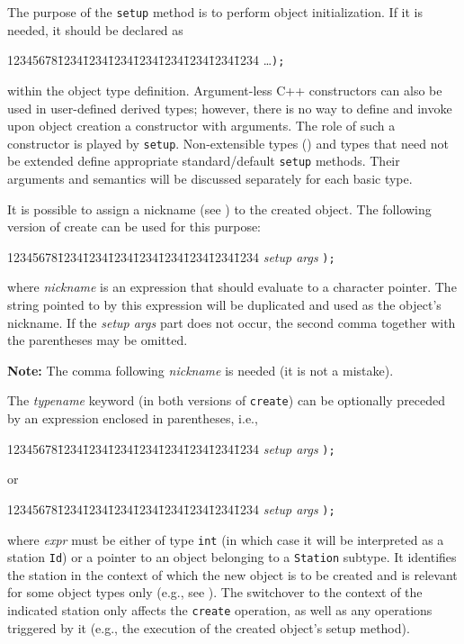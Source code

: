 The purpose of the {\tt setup} method is to perform object
initialization.
If it is needed, it should be declared as
{\tt\begin{tabbing}
12345678\=1234\=1234\=1234\=1234\=1234\=1234\=1234\=1234\kill
{}\ldots {\tt );}
\end{tabbing}}
\noindent
within the object type definition.
Argument-less C++ constructors can also be used in user-defined derived
{\smurph}
types; however, there is no way to define and invoke upon object
creation a constructor with arguments.
The role of such a constructor is played by {\tt setup}.
Non-extensible types () and types that need not be
extended define appropriate standard/default {\tt setup} methods.
Their arguments and semantics will be discussed separately for each 
basic type.

It is possible to assign a nickname (see )
to the created object.
The following version of create can be used for this purpose:
{\tt\begin{tabbing}
12345678\=1234\=1234\=1234\=1234\=1234\=1234\=1234\=1234\kill
{} {\em setup args\/} {\tt );}
\end{tabbing}}
\noindent
where {\em nickname\/} is an expression that should evaluate to a
character pointer.
The string pointed to by this expression will be duplicated and used
as the object's nickname.
If the {\em setup args\/} part does not occur, the second comma together
with the parentheses may be omitted.

\medskip
\noindent
{\bf Note:} The comma following {\em nickname\/} is needed (it
is not a mistake).

\medskip
\noindent

The {\em typename\/} keyword (in both versions of {\tt create}) can be
optionally preceded by an expression enclosed in parentheses, i.e.,
{\tt\begin{tabbing}
12345678\=1234\=1234\=1234\=1234\=1234\=1234\=1234\=1234\kill
{} {\em setup args\/} {\tt );} \\
\end{tabbing}}
or
{\tt\begin{tabbing}
12345678\=1234\=1234\=1234\=1234\=1234\=1234\=1234\=1234\kill
{} {\em setup args\/} {\tt );}
\end{tabbing}}
\noindent
where {\em expr\/} must be either of type {\tt int} (in which case it will be
interpreted as a station {\tt Id})
or a pointer to an object belonging to a {\tt Station} subtype.
It identifies the
station in the context of which the new object is to be created and is
relevant for some object types only (e.g., see ).
The switchover to the context of the indicated station
only affects the {\tt create} operation, as well as any operations triggered
by it (e.g., the execution of the created object's setup method).

